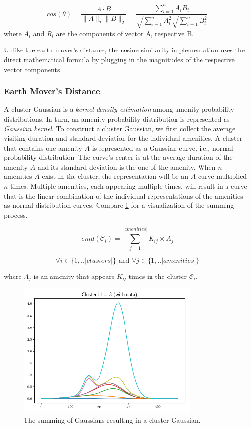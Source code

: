 \begin{equation}
cos(\theta)=\frac{A\cdot B}{{\lVert}A{\rVert}       
	_2{\lVert}B{\rVert}_2}=\frac{\sum_{i=1}^n{A_iB_i}}{\sqrt{\sum_{i=1}^n{A_i^2}}\sqrt{\sum_{i=1}^n{B_i^2}}}
\end{equation}
where $A_i$ and $B_i$ are the components of vector A, respective B. 

Unlike the earth mover's distance, the cosine similarity implementation uses the direct mathematical formula by plugging in the magnitudes of the respective vector components.

\subsubsection{Earth Mover's Distance}
\label{realization:gaussians}

A cluster Gaussian is a \textit{kernel density estimation} among amenity probability distributions.
In turn, an amenity probability distribution is represented as \textit{Gaussian kernel}.
To construct a cluster Gaussian, we first collect the average visiting duration and standard deviation for the individual amenities.
A cluster that contains one amenity $A$ is represented as a Gaussian curve, i.e., normal probability distribution.
The curve's center is at the average duration of the amenity $A$ and its standard deviation is the one of the amenity.
When $n$ amenities $A$ exist in the cluster, the representation will be an $A$ curve multiplied $n$ times.
Multiple amenities, each appearing multiple times, will result in a curve that is the linear combination of the individual representations of the amenities as normal distribution curves.
Compare \cref{fig:gaussian} for a visualization of the summing process.

\begin{equation}
emd(\mathcal{C}_i) = \sum_{j=1}^{|amenities|} K_{ij} \times A_j
\end{equation}

$$\forall i \in \{1,..|clusters|\} \text{ and } \forall j \in \{1,..|amenities|\}$$

where $A_j$ is an amenity that appears $K_{ij}$ times in the cluster $\mathcal{C}_i$.

\begin{figure}[!ht]
	\centering
	\includegraphics[width=0.8\textwidth]{graphics/emd_gaussian_addition3.png}
	\caption{The summing of Gaussians resulting in a cluster Gaussian.}
	\label{fig:gaussian}
\end{figure}

